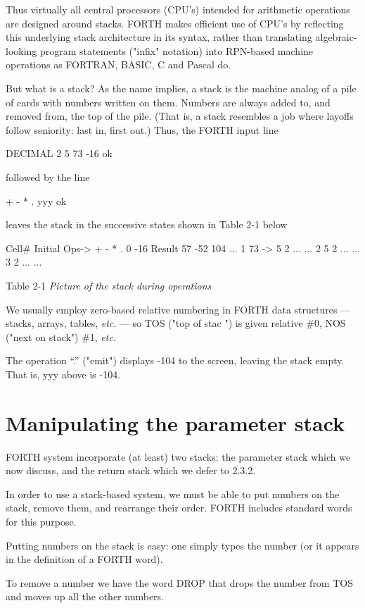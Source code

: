Thus virtually all central processors (CPU’s) intended for arithmetic operations are designed around stacks. FORTH makes efficient use of CPU's by reflecting this underlying stack architecture in its syntax, rather than translating algebraic-looking program statements ("infix" notation) into RPN-based machine operations as FORTRAN, BASIC, C and Pascal do.

But what is a stack? As the name implies, a stack is the machine analog of a pile of cards with numbers written on them. Numbers are always added to, and removed from, the top of the pile. (That is, a stack resembles a job where layoffs follow seniority: last in, first out.) Thus, the FORTH input line

DECIMAL 2 5 73 -16 ok

followed by the line

+ - * . yyy ok

leaves the stack in the successive states shown in Table 2-1 below 

Cell\# 	Initial 	Ops-> 	+ 	-	*	.
0 		-16 		Result 	57 	-52	104	...
1 		73 		-> 		5 	2	...	...
2 		5 		2		...	...
3 		2		...		...

 Table 2-1 \textit{Picture of the stack during operations}

We usually employ zero-based relative numbering in FORTH data structures —stacks, arrays, tables,  \textit{\textit{etc}}.  — so TOS ("top of stac ") is given relative \#0, NOS ("next on stack") \#1, \textit{\textit{etc}}.

The operation ``.'' ("emit") displays -104 to the screen, leaving the stack empty. That is, yyy above is -104.

\section{Manipulating the parameter stack}

FORTH system incorporate (at least) two stacks: the parameter stack which we now discuss, and the return stack which we defer to 2.3.2.

In order to use a stack-based system, we must be able to put numbers on the stack, remove them, and rearrange their order. FORTH includes standard words for this purpose.

Putting numbers on the stack is easy: one simply types the number (or it appears in the definition of a FORTH word).

To remove a number we have the word DROP that drops the number from TOS and moves up all the other numbers.

